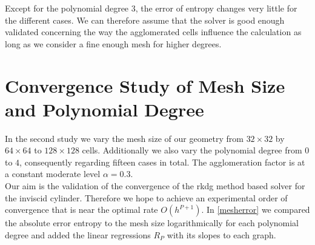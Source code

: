 	Except for the polynomial degree $3$, the error of entropy changes very little for the different cases. We can therefore assume that the solver is good enough validated concerning the way the agglomerated cells influence the calculation as long as we consider a fine enough mesh for higher degrees.
	
	\section{Convergence Study of Mesh Size and Polynomial Degree}
	
	In the second study we vary the mesh size of our geometry from $32 \times 32$ by $64 \times 64$ to $128 \times 128$ cells. Additionally we also vary the polynomial degree from $0$ to $4$, consequently regarding fifteen cases in total. The agglomeration factor is at a constant moderate level $\alpha = 0.3$.\\
	Our aim is the validation of the convergence of the \gls{rkdg} method based solver for the inviscid cylinder. Therefore we hope to achieve an experimental order of convergence that is near the optimal rate $O(h^{P+1})$. In  \cref{mesherror} we compared the absolute error entropy to the mesh size logarithmically for each polynomial degree and added the linear regressions $R_P$ with its slopes to each graph. 	\\\\
